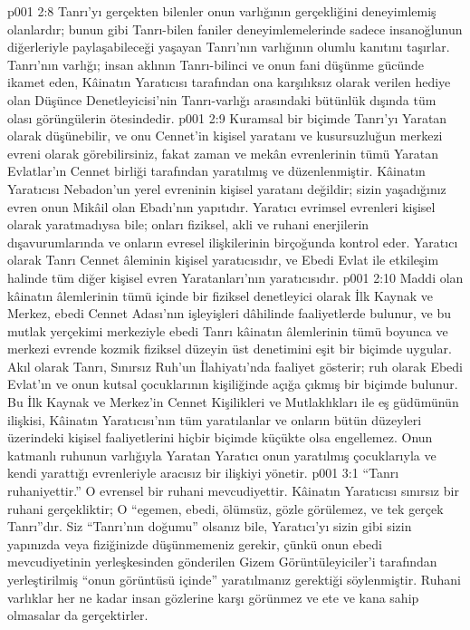 \vs p001 2:8 Tanrı’yı gerçekten bilenler onun varlığının gerçekliğini deneyimlemiş olanlardır; bunun gibi Tanrı\hyp{}bilen faniler deneyimlemelerinde sadece insanoğlunun diğerleriyle paylaşabileceği yaşayan Tanrı’nın varlığının olumlu kanıtını taşırlar. Tanrı’nın varlığı; insan aklının Tanrı\hyp{}bilinci ve onun fani düşünme gücünde ikamet eden, Kâinatın Yaratıcısı tarafından ona karşılıksız olarak verilen hediye olan Düşünce Denetleyicisi’nin Tanrı\hyp{}varlığı arasındaki bütünlük dışında tüm olası görüngülerin ötesindedir.
\vs p001 2:9 Kuramsal bir biçimde Tanrı’yı Yaratan olarak düşünebilir, ve onu Cennet’in kişisel yaratanı ve kusursuzluğun merkezi evreni olarak görebilirsiniz, fakat zaman ve mekân evrenlerinin tümü Yaratan Evlatlar’ın Cennet birliği tarafından yaratılmış ve düzenlenmiştir. Kâinatın Yaratıcısı Nebadon’un yerel evreninin kişisel yaratanı değildir; sizin yaşadığınız evren onun Mikâil olan Ebadı’nın yapıtıdır. Yaratıcı evrimsel evrenleri kişisel olarak yaratmadıysa bile; onları fiziksel, akli ve ruhani enerjilerin dışavurumlarında ve onların evresel ilişkilerinin birçoğunda kontrol eder. Yaratıcı olarak Tanrı Cennet âleminin kişisel yaratıcısıdır, ve Ebedi Evlat ile etkileşim halinde tüm diğer kişisel evren Yaratanları’nın yaratıcısıdır.
\vs p001 2:10 Maddi olan kâinatın âlemlerinin tümü içinde bir fiziksel denetleyici olarak İlk Kaynak ve Merkez, ebedi Cennet Adası’nın işleyişleri dâhilinde faaliyetlerde bulunur, ve bu mutlak yerçekimi merkeziyle ebedi Tanrı kâinatın âlemlerinin tümü boyunca ve merkezi evrende kozmik fiziksel düzeyin üst denetimini eşit bir biçimde uygular. Akıl olarak Tanrı, Sınırsız Ruh’un İlahiyatı’nda faaliyet gösterir; ruh olarak Ebedi Evlat’ın ve onun kutsal çocuklarının kişiliğinde açığa çıkmış bir biçimde bulunur. Bu İlk Kaynak ve Merkez’in Cennet Kişilikleri ve Mutlaklıkları ile eş güdümünün ilişkisi, Kâinatın Yaratıcısı’nın tüm yaratılanlar ve onların bütün düzeyleri üzerindeki  kişisel faaliyetlerini hiçbir biçimde küçükte olsa engellemez. Onun katmanlı ruhunun varlığıyla Yaratan Yaratıcı onun yaratılmış çocuklarıyla ve kendi yarattığı evrenleriyle aracısız bir ilişkiyi yönetir.
\vs p001 3:1 “Tanrı ruhaniyettir.” O evrensel bir ruhani mevcudiyettir. Kâinatın Yaratıcısı sınırsız bir ruhani gerçekliktir; O “egemen, ebedi, ölümsüz, gözle görülemez, ve tek gerçek Tanrı”dır. Siz “Tanrı’nın doğumu” olsanız bile, Yaratıcı’yı sizin gibi sizin yapınızda veya fiziğinizde düşünmemeniz gerekir, çünkü onun ebedi mevcudiyetinin yerleşkesinden gönderilen Gizem Görüntüleyiciler’i tarafından yerleştirilmiş “onun görüntüsü içinde” yaratılmanız gerektiği söylenmiştir. Ruhani varlıklar her ne kadar insan gözlerine karşı görünmez ve ete ve kana sahip olmasalar da gerçektirler.
